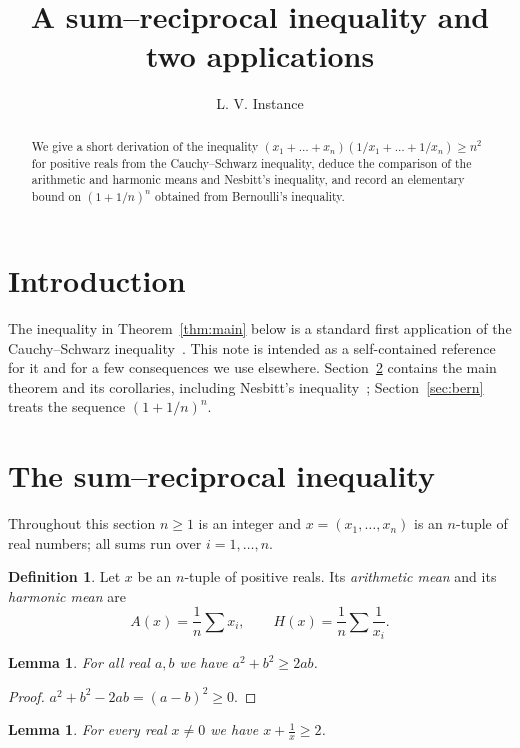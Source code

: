 \documentclass[11pt]{amsart}
\title{A sum--reciprocal inequality and two applications}
\author{L. V. Instance}
\date{}
\newtheorem{lemma}[theorem]{Lemma}
\theoremstyle{definition}
\newtheorem{definition}[theorem]{Definition}
\theoremstyle{remark}
\begin{document}
\begin{abstract}
We give a short derivation of the inequality
$(x_1+\dots+x_n)(1/x_1+\dots+1/x_n)\ge n^2$ for positive reals from the
Cauchy--Schwarz inequality, deduce the comparison of the arithmetic and
harmonic means and Nesbitt's inequality, and record an elementary bound on
$(1+1/n)^n$ obtained from Bernoulli's inequality.
\end{abstract}

\maketitle

\section{Introduction}

The inequality in Theorem~\ref{thm:main} below is a standard first
application of the Cauchy--Schwarz inequality~\cite{Cau}. This note is
intended as a self-contained reference for it and for a few consequences we
use elsewhere. Section~\ref{sec:sr} contains the main theorem and its
corollaries, including Nesbitt's inequality~\cite{Nes}; Section~\ref{sec:bern}
treats the sequence $(1+1/n)^n$.

\section{The sum--reciprocal inequality}\label{sec:sr}

Throughout this section $n\ge 1$ is an integer and $x=(x_1,\dots,x_n)$ is an
$n$-tuple of real numbers; all sums run over $i=1,\dots,n$.

\begin{definition}\label{def:means}
Let $x$ be an $n$-tuple of positive reals. Its \emph{arithmetic mean} and its
\emph{harmonic mean} are
\[
  A(x)=\frac1n\sum x_i,\qquad H(x)=\frac1n\sum\frac{1}{x_i}.
\]
\end{definition}

\begin{lemma}\label{lem:2ab}
For all real $a,b$ we have $a^2+b^2\ge 2ab$.
\end{lemma}

\begin{proof}
$a^2+b^2-2ab=(a-b)^2\ge 0$.
\end{proof}

\begin{lemma}\label{lem:recip}
For every real $x\ne 0$ we have $x+\frac1x\ge 2$.
\end{lemma}
\end{document}
